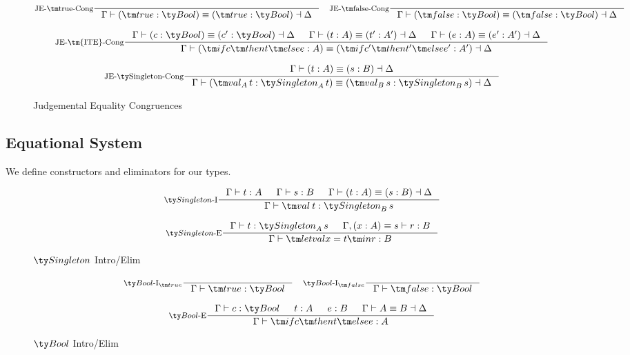 \begin{figure*}[h]
  \[
    \inference[JE-\true-Cong]{}
                    {\Gamma \vdash (\true : \Bool) \equiv (\true : \Bool) \dashv \Delta}
    \quad
    \inference[JE-\false-Cong]{}
                    {\Gamma \vdash (\false : \Bool) \equiv (\false : \Bool) \dashv \Delta}
  \]

  \[
  \inference[JE-\tm{ITE}-Cong]
            { \Gamma \vdash (c : \Bool) \equiv (c' : \Bool) \dashv \Delta
            & \Gamma \vdash (t : A) \equiv (t' : A') \dashv \Delta
            & \Gamma \vdash (e : A) \equiv (e' : A') \dashv \Delta
            }
            {\Gamma \vdash (\ite c t e : A) \equiv (\ite{c'}{t'}{e'} : A') \dashv \Delta}
  \]

  \[
    \inference[JE-\Singleton-Cong]{\Gamma \vdash (t : A) \equiv (s : B) \dashv \Delta}
                     {\Gamma \vdash (\val[A][t] : \Singleton[A][t]) \equiv (\val[B][s] : \Singleton[B][s]) \dashv \Delta}
  \]

  \caption*{Judgemental Equality Congruences}
  \label{fig:dt-singletons-je-cong}
\end{figure*}



\subsection{Equational System}
We define constructors and eliminators for our types.

\begin{figure*}[h]
  \[
  \inference[\Intro{$\Singleton$}]
            { \Gamma \vdash t : A
            & \Gamma \vdash s : B
            & \Gamma \vdash (t : A) \equiv (s : B) \dashv \Delta
            }
            {\Gamma \vdash \val[][t] : \Singleton[B][s]}
  \]

  \[
  \inference[\Elim{$\Singleton$}]
            {\Gamma \vdash t : \Singleton[A][s]
            & \Gamma, (x : A) \equiv s \vdash r : B}
            {\Gamma \vdash \letval x t r : B}
  \]

  \caption*{$\Singleton$ Intro/Elim}
  \label{fig:dt-singletons-singleton-intro-elim}
\end{figure*}

\begin{figure*}[h]
  \[
  \inference[\Intro{$\Bool$}$_{\true}$]{}
            {\Gamma \vdash \true : \Bool}
  \quad
  \inference[\Intro{$\Bool$}$_{\false}$]{}
            {\Gamma \vdash \false : \Bool}
  \]

  \[
  \inference[\Elim{$\Bool$}]
            {\Gamma \vdash c : \Bool
            & t : A
            & e : B
            & \Gamma \vdash A \equiv B \dashv \Delta
            }
            {\Gamma \vdash \ite c t e : A}
  \]

  \caption*{$\Bool$ Intro/Elim}
  \label{fig:dt-singletons-bool-intro-elim}
\end{figure*}

